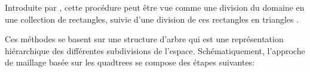 Introduite par  \cite{yerry1983finite}, cette procédure peut être vue comme une division du domaine en une collection de rectangles, suivie d'une division de ces rectangles en triangles \cite{baker2005mesh}.

Ces méthodes se basent sur une structure d'arbre qui est une représentation hiérarchique des différentes subdivisions de l'espace. Schématiquement, l'approche de maillage basée sur les quadtrees se compose des étapes suivantes:


